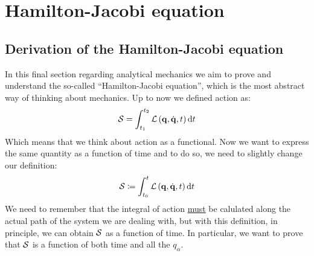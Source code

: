 \chapter[H-J Equation]{Hamilton-Jacobi equation}
\section{Derivation of the Hamilton-Jacobi equation}
In this final section regarding analytical mechanics we aim to prove and understand the so-called ``Hamilton-Jacobi equation'', which is the most abstract way of thinking about mechanics. Up to now we defined action as:
\begin{equation}
  \mathcal{S} = \int_{t_1}^{t_2}\mathcal{L}\left(\vb{q},\dot{\vb{q}},t\right) \dd{t}
\end{equation}
Which means that we think about action as a functional. Now we want to express the same quantity as a function of time and to do so, we need to slightly change our definition:
\begin{equation}
  \mathcal{S} \coloneqq \int_{t_0}^{t}\mathcal{L}\left(\vb{q},\dot{\vb{q}},t\right) \dd{t}
\end{equation}
We need to remember that the integral of action \underline{must} be calulated along the actual path of the system we are dealing with, but with this definition, in principle, we can obtain $\mathcal{S}$ as a function of time. In particular, we want to prove that $\mathcal{S}$ is a function of both time and all the $q_{\alpha}$.
